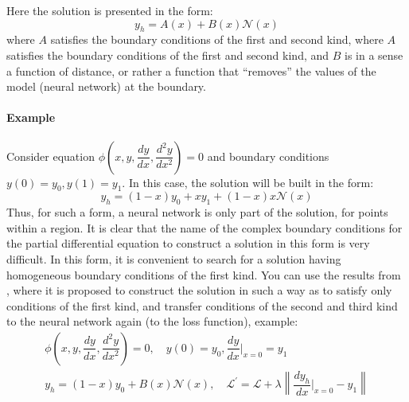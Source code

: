 Here the solution is presented in the form:
\begin{equation}
	\label{eq:simple_solver}
	y_h = A(x) + B(x) \mathcal{N}(x)
\end{equation}
where $A$ satisfies the boundary conditions of the first and second kind, where $A$ satisfies the boundary conditions of the first and second kind, and $B$ is in a sense a function of distance, or rather a function that “removes” the values of the model (neural network) at the boundary. 
\paragraph{Example}
Consider equation $\phi \left ( x, y, \dfrac{d y}{d x}, \dfrac{d^2 y}{d x^2} \right ) = 0$ and boundary conditions $y(0) = y_0, y(1) = y_1$. In this case, the solution will be built in the form:
\begin{equation*}
	y_h = (1 - x) y_0 + x y_1 + (1 - x) x \mathcal{N}(x)
\end{equation*}
Thus, for such a form, a neural network is only part of the solution, for points within a region. It is clear that the name of the complex boundary conditions for the partial differential equation to construct a solution in this form is very difficult. In this form, it is convenient to search for a solution having homogeneous boundary conditions of the first kind. You can use the results from \cite{fletcher2012computational}, where it is proposed to construct the solution in such a way as to satisfy only conditions of the first kind, and transfer conditions of the second and third kind to the neural network again (to the loss function), example:
\begin{equation*}
	\begin{multlined}
		\phi \left ( x, y, \dfrac{d y}{d x}, \dfrac{d^2 y}{d x^2} \right ) = 0, \quad y(0) =  y_0, \dfrac{d y}{d x} \Big|_{x = 0} = y_1 \\
		y_h = (1 - x) y_0 + B(x) \mathcal{N}(x), \quad \mathcal{L}^{'} = \mathcal{L} + \lambda \left \| \dfrac{d y_h}{d x}\Big|_{x = 0} - y_1  \right \|
	\end{multlined}
\end{equation*}
